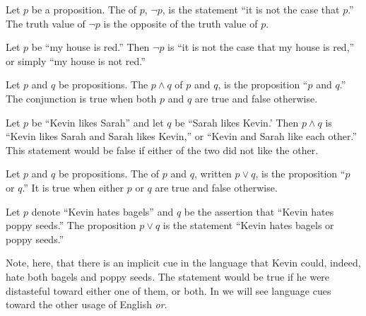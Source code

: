 \begin{defn}[negation]
  Let \(p\) be a proposition.
  The  of \(p\),
  $\neg p$,
  is the statement
  ``it is not the case that \(p\).''
  The truth value of \(\neg p\) is the opposite of the truth value of \(p\).
\end{defn}

\begin{ex}
  Let $p$ be ``my house is red.''
  Then $\neg p$ is
  ``it is not the case that my house is red,''
  or simply
  ``my house is not red.''
\end{ex}

\begin{defn}[conjunction]
  Let $p$ and $q$ be propositions.
  The 
  $p \wedge q$
  of $p$ and $q$,
  is the proposition
  ``$p$ and $q$.''
  The conjunction is true when both $p$ and $q$ are true and false otherwise.
\end{defn}

\begin{ex}
  Let $p$ be ``Kevin likes Sarah'' and let $q$ be ``Sarah likes Kevin.'
  Then $p \wedge q$ is
  ``Kevin likes Sarah and Sarah likes Kevin,''
  or ``Kevin and Sarah like each other.''
  This statement would be false if either of the two did not like the other.
\end{ex}

\begin{defn}[disjunction]
  Let \(p\) and \(q\) be propositions.
  The 
  of \(p\) and \(q\),
  written $p \vee q$,
  is the proposition
  ``\(p\) or \(q\).''
  It is true when either \(p\) or \(q\) are true and false otherwise.
\end{defn}

\begin{ex}
  Let $p$ denote ``Kevin hates bagels'' and
  $q$ be the assertion that ``Kevin hates poppy seeds.''
  The proposition $p \vee q$ is the statement ``Kevin hates bagels or poppy seeds.''
  \begin{remark}
    Note, here, that there is an implicit cue in the language that Kevin could,
    indeed, hate both bagels and poppy seeds.
    The statement would be true if he were distasteful toward either one of them,
    or both. In  we will see language cues toward the
    other usage of English \emph{or}.
  \end{remark}
\end{ex}

